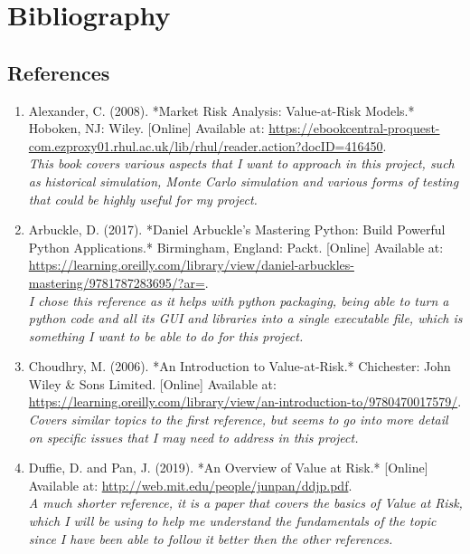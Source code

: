 \documentclass{article}
\begin{document}
\newpage
\section{Bibliography}
\subsection{References}
\begin{small}
\begin{enumerate}
  \item\label{ref1} Alexander, C. (2008). *Market Risk Analysis: Value-at-Risk Models.* Hoboken, NJ: Wiley. [Online] Available at: \url{https://ebookcentral-proquest-com.ezproxy01.rhul.ac.uk/lib/rhul/reader.action?docID=416450}.
  \\\textit{This book covers various aspects that I want to approach in this project, such as historical simulation, Monte Carlo simulation and various forms of testing that could be highly useful for my project.}
  
  \item\label{ref2} Arbuckle, D. (2017). *Daniel Arbuckle’s Mastering Python: Build Powerful Python Applications.* Birmingham, England: Packt. [Online] Available at: \url{https://learning.oreilly.com/library/view/daniel-arbuckles-mastering/9781787283695/?ar=}.
  \\\textit{I chose this reference as it helps with python packaging, being able to turn a python code and all its GUI and libraries into a single executable file, which is something I want to be able to do for this project.}

  \item\label{ref3} Choudhry, M. (2006). *An Introduction to Value-at-Risk.* Chichester: John Wiley \& Sons Limited. [Online] Available at: \\ \url{https://learning.oreilly.com/library/view/an-introduction-to/9780470017579/}.
  \\\textit{Covers similar topics to the first reference, but seems to go into more detail on specific issues that I may need to address in this project.}
  
  \item\label{ref4} Duffie, D. and Pan, J. (2019). *An Overview of Value at Risk.* [Online] Available at: \url{http://web.mit.edu/people/junpan/ddjp.pdf}.
  \\\textit{A much shorter reference, it is a paper that covers the basics of Value at Risk, which I will be using to help me understand the fundamentals of the topic since I have been able to follow it better then the other references.}
  

\end{enumerate}
\end{small}
\end{document}

